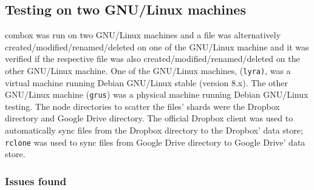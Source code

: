 \subsection{Testing on two GNU/Linux machines}

combox was run on two GNU/Linux machines and a file was alternatively
created/modified/renamed/deleted on one of the GNU/Linux machine and
it was verified if the respective file was also
created/modified/renamed/deleted on the other GNU/Linux machine. One
of the GNU/Linux machines, (\verb+lyra)+, was a virtual machine running
Debian GNU/Linux stable (version 8.x). The other GNU/Linux machine
(\verb+grus+) was a physical machine running Debian GNU/Linux
testing. The node directories to scatter the files' shards were the
Dropbox directory and Google Drive directory. The official Dropbox
client was used to automatically sync files from the Dropbox directory
to the Dropbox' data store; \verb+rclone+\cite{program:rclone} was
used to sync files from Google Drive directory to Google Drive'
data store.

\subsubsection{Issues found}\label{ch-4-2gnus-issues}

